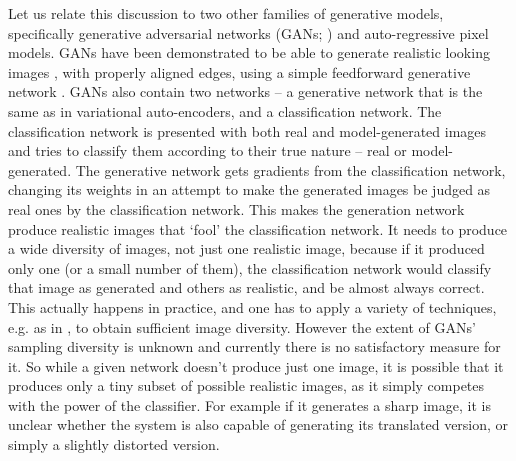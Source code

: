 \documentclass{article}
\begin{document}
Let us relate this discussion to two other families of generative models, specifically generative adversarial networks (GANs; \citet{goodfellow2014generative}) and auto-regressive pixel models. GANs have been demonstrated to be able to generate realistic looking images \cite{denton2015deep, radford2015unsupervised}, with properly aligned edges, using a simple feedforward generative network \cite{radford2015unsupervised}. GANs also contain two networks -- a generative network that is the same as in variational auto-encoders, and a classification network. The classification network is presented with both real and model-generated images and tries to classify them according to their true nature -- real or model-generated. The generative network gets gradients from the classification network, changing its weights in an attempt to make the generated images be judged as real ones by the classification network. This makes the generation network produce realistic images that `fool' the classification network. It needs to produce a wide diversity of images, not just one realistic image, because if it produced only one (or a small number of them), the classification network would classify that image as generated and others as realistic, and be almost always correct. This actually happens in practice, and one has to apply a variety of techniques, e.g. as in \cite{radford2015unsupervised}, to obtain sufficient image diversity. However the extent of GANs' sampling diversity is unknown and currently there is no satisfactory measure for it. So while a given network doesn't produce just one image, it is possible that it produces only a tiny subset of possible realistic images, as it simply competes with the power of the classifier. For example if it generates a sharp image, it is unclear whether the system is also capable of generating its translated version, or simply a slightly distorted version.
\end{document}

